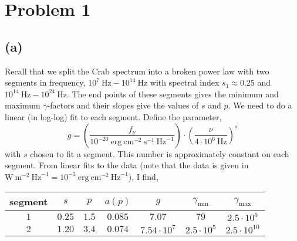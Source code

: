 \documentclass[12pt]{article}
\begin{document}

\section{Problem 1}

\subsection*{(a)}

Recall that we split the Crab spectrum into a broken power law with two segments in frequency, $10^{7} \: \mathrm{Hz} - 10^{14} \: \mathrm{Hz}$ with spectral index $s_1 \approx 0.25$ and $10^{14} \: \mathrm{Hz} - 10^{24} \: \mathrm{Hz}$. The end points of these segments gives the minimum and maximum $\gamma$-factors and their slopes give the values of $s$ and $p$. We need to do a linear (in log-log) fit to each segment. Define the parameter,
\[ g = \left( \frac{f_\nu}{10^{-20} \: \mathrm{erg} \: \mathrm{cm}^{-2} \: \mathrm{s}^{-1} \: \mathrm{Hz}^{-1}} \right) \cdot \left( \frac{\nu}{4 \cdot 10^6 \: \mathrm{Hz}} \right)^{s} \]  
with $s$ chosen to fit a segment. This number is approximately constant on each segment.
From linear fits to the data (note that the data is given in $\mathrm{W} \: \mathrm{m}^{-2} \: \mathrm{Hz}^{-1} = 10^{-3} \: \mathrm{erg} \: \mathrm{cm}^{-2} \: \mathrm{Hz}^{-1}$), I find,
\begin{center}
 \begin{tabular}{||c c c c c c c||} 
 \hline
 segment & $s$ & $p$ & $a(p)$ & $g$ & $\gamma_{\text{min}}$ & $\gamma_{\text{max}}$
 \\ [0.5ex] 
 \hline\hline
 $1$ & $0.25$ & $1.5$ & $0.085$ & $7.07$ & $79$ & $2.5 \cdot 10^5$ \\ 
 \hline
 $2$ & $1.20$ & $3.4$ & $0.074$ & $7.54 \cdot 10^7$ & $2.5 \cdot 10^5$ & $2.5 \cdot 10^{10}$ \\
 \hline
\end{tabular}
\end{center}
\end{document}
